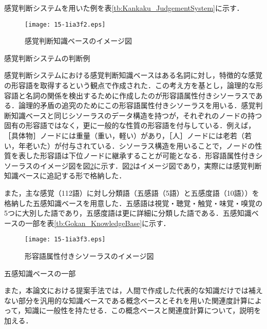 \documentclass[japanese]{jnlp_1.4}
\begin{document}
感覚判断システムを用いた例を表\ref{tb:Kankaku_JudgementSystem}に示す．

\begin{figure}[b]
	\begin{center}
    \texttt{[image: 15-1ia3f2.eps]}
		\caption{感覚判断知識ベースのイメージ図}
		\label{fig:kankakuDB}
	\end{center}
\end{figure}
\begin{table}[b]
	\caption{感覚判断システムの判断例}
	\label{tb:Kankaku_JudgementSystem}

\end{table}

感覚判断システムにおける感覚判断知識ベースはある名詞に対し，特徴的な感覚の形容語を取得するという観点で作成された．この考え方を基とし，論理的な形容語と名詞の関係を検出するために作成したのが形容語属性付きシソーラスである．論理的矛盾の追究のためにこの形容語属性付きシソーラスを用いる．感覚判断知識ベースと同じシソーラスのデータ構造を持つが，それぞれのノードの持つ固有の形容語ではなく，更に一般的な性質の形容語を付与している．例えば，［具体物］ノードには重量（重い，軽い）があり，［人］ノードには老若（若い，年老いた）が付与されている．シソーラス構造を用いることで，ノードの性質を表した形容語は下位ノードに継承することが可能となる．形容語属性付きシソーラスのイメージ図を図\ref{fig:keiyou}に示す．図\ref{fig:keiyou}はイメージ図であり，実際には感覚判断知識ベースに追記する形で格納した．

また，主な感覚（112語）に対し分類語（五感語（5語）と五感度語（10語））を格納した五感知識ベースを用意した．五感語は視覚・聴覚・触覚・味覚・嗅覚の5つに大別した語であり，五感度語は更に詳細に分類した語である．五感知識ベースの一部を表\ref{tb:Gokan_KnowledgeBase}に示す．

\begin{figure}[b]
	\begin{center}
    \texttt{[image: 15-1ia3f3.eps]}
		\caption{形容語属性付きシソーラスのイメージ図}
		\label{fig:keiyou}
	\end{center}
\end{figure}
\begin{table}[b]
	\caption{五感知識ベースの一部}
	\label{tb:Gokan_KnowledgeBase}

\end{table}

また，本論文における提案手法では，人間で作成した代表的な知識だけでは補えない部分を汎用的な知識ベースである概念ベースとそれを用いた関連度計算によって，知識に一般性を持たせる．この概念ベース\cite{Hirose2002}と関連度計算\cite{Watabe2006}について，説明を加える．
\end{document}
